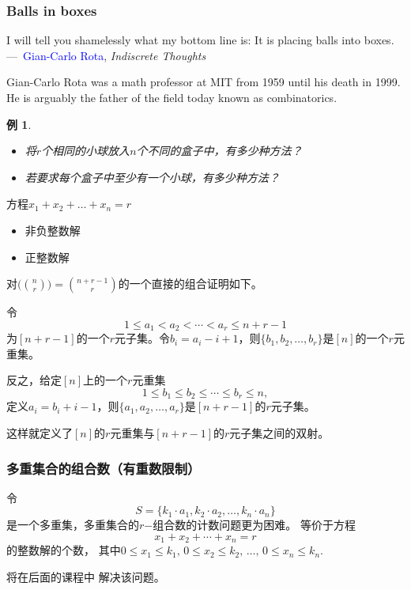 \documentclass[13pt, punct]{ctexbeamer}
\newtheorem{ex}{例}[section]
\newcommand{\blue}{\textcolor{blue}}
\begin{document}
\begin{frame}\frametitle{Balls in boxes}
    I will tell you shamelessly what my bottom line is:
    \alert{It is placing balls into boxes}.
    \qquad	\qquad	\qquad	\qquad	 \qquad  ---\ \blue{Gian-Carlo Rota}, \emph{Indiscrete Thoughts}

    Gian-Carlo Rota was a math professor at MIT from 1959 until his death in 1999.
    He is arguably the father of the field today known as  combinatorics.

    \begin{ex}
        \begin{itemize}
            \item[i)]	将$r$个相同的小球放入$n$个不同的盒子中，有多少种方法？

            \item[ii)] 若要求每个盒子中至少有一个小球，有多少种方法？
        \end{itemize}
    \end{ex}

    \pause
    方程$x_1+x_2+\dots +x_n=r$
    \begin{itemize}
        \item[i)] 非负整数解

        \item[ii)] 正整数解
    \end{itemize}
\end{frame}


\begin{frame}
	对$\big(\!{n\choose	r}\!\big)={n+r-1\choose	r}$的一个直接的组合证明如下。

	令$$1\leq a_1< a_2<\cdots <a_r\leq n+r-1$$为$[n+r-1]$的一个$r$元子集。令$b_i=a_i-i+1$，则$\{b_1,b_2,\ldots,b_r\}$是$[n]$的一个$r$元重集。

	反之，给定$[n]$上的一个$r$元重集$$1\leq b_1\leq b_2\leq\cdots\leq b_r\leq
	n,$$定义$a_i=b_i+i-1$，则$\{a_1,a_2,\ldots,a_r\}$是$[n+r-1]$的$r$元子集。

	这样就定义了$[n]$的$r$元重集与$[n+r-1]$的$
	r$元子集之间的双射。
\end{frame}



\begin{frame}\frametitle{多重集合的组合数（有重数限制）}

令$$S= \{k_1 \cdot a_1, k_2 \cdot a_2, \ldots, k_n \cdot a_n\}$$是一个多重集，多重集合的$r$−组合数的计数问题更为困难。
等价于方程$$x_1+x_2+\cdots+x_n=r$$的整数解的个数，
其中$0\le x_1 \le k_1, \, 0\le x_2 \le k_2, \,  \ldots, \, 0\le x_n \le k_n$.

将在后面的课程中
解决该问题。

\end{frame}
\end{document}
